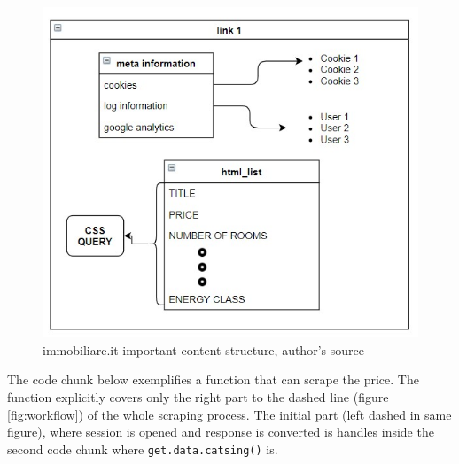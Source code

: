 \documentclass[
  12pt,
  a4paper,
  oneside]{book}
\theoremstyle{definition}
\theoremstyle{definition}
\theoremstyle{definition}
\theoremstyle{remark}
\begin{document}
\begin{figure}
\centering
\includegraphics{images/content_structure.jpg}
\caption{\label{fig:ContentStructure}immobiliare.it important content structure, author's source}
\end{figure}

The code chunk below exemplifies a function that can scrape the price. The function explicitly covers only the right part to the dashed line (figure \ref{fig:workflow}) of the whole scraping process. The initial part (left dashed in same figure), where session is opened and response is converted is handles inside the second code chunk where \texttt{get.data.catsing()} is.
\end{document}
